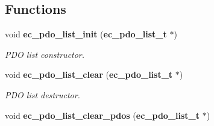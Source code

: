\subsection*{\-Functions}
\begin{DoxyCompactItemize}
\item 
void {\bf ec\-\_\-pdo\-\_\-list\-\_\-init} ({\bf ec\-\_\-pdo\-\_\-list\-\_\-t} $\ast$)\label{pdo__list_8h_aee1095c2e92c859063b1ed782e5bf7d6}

\begin{DoxyCompactList}\small\item\em \-P\-D\-O list constructor. \end{DoxyCompactList}\item 
void {\bf ec\-\_\-pdo\-\_\-list\-\_\-clear} ({\bf ec\-\_\-pdo\-\_\-list\-\_\-t} $\ast$)\label{pdo__list_8h_aa9f079345fae9a1b8ceb9d142ff41368}

\begin{DoxyCompactList}\small\item\em \-P\-D\-O list destructor. \end{DoxyCompactList}\item 
void {\bf ec\-\_\-pdo\-\_\-list\-\_\-clear\-\_\-pdos} ({\bf ec\-\_\-pdo\-\_\-list\-\_\-t} $\ast$)\label{pdo__list_8h_a6b1d3da4ada951f662be5dc4c8519026}


\end{DoxyCompactItemize}
